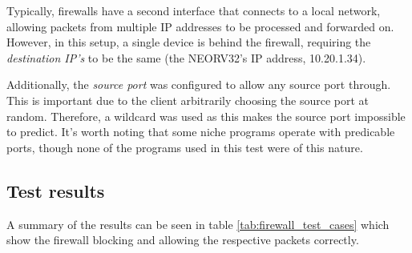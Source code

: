 Typically, firewalls have a second interface that connects to a local network, allowing packets from multiple IP addresses to be processed and forwarded on. However, in this setup, a single device is behind the firewall, requiring the \textit{destination IP's} to be the same (the NEORV32's IP address, 10.20.1.34). 

Additionally, the \textit{source port} was configured to allow any source port through. This is important due to the client arbitrarily choosing the source port at random. Therefore, a wildcard was used as this makes the source port impossible to predict. It's worth noting that some niche programs operate with predicable ports, though none of the programs used in this test were of this nature.


\subsection{Test results}

A summary of the results can be seen in table \ref{tab:firewall_test_cases} which show the firewall blocking and allowing the respective packets correctly.

